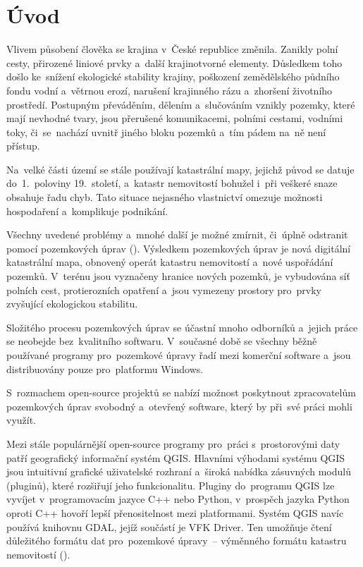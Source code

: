 \chapter{Úvod}
\label{1-uvod}

Vlivem působení člověka se krajina v~České republice změnila. Zanikly polní cesty, přirozené liniové prvky a~další krajinotvorné elementy. Důsledkem toho došlo ke~sní\-žení ekologické stability krajiny, poškození zemědělského půdního fondu vodní a~vě\-trnou erozí, narušení krajinného rázu a~zhoršení životního prostředí. Postupným převáděním, dělením a~slučováním vznikly pozemky, které mají nevhodné tvary, jsou přerušené komunikacemi, polními cestami, vodními toky, či~se~nachází uvnitř jiného bloku pozemků a~tím pádem na~ně není přístup.

Na~velké části území se stále používají katastrální mapy, jejichž původ se datuje do~1.~poloviny 19.~století, a~katastr nemovitostí bohužel i~při veškeré snaze obsahuje řadu chyb. Tato situace nejasného vlastnictví omezuje možnosti hospodaření a~komplikuje podnikání.

Všechny uvedené problémy a~mnohé další je možné zmírnit, či~úplně odstranit pomocí pozemkových úprav (). Výsledkem pozemkových úprav je nová digi\-tální katastrální mapa, obnovený operát katastru nemovitostí a~nové uspořádání pozemků. V~terénu jsou vyznačeny hranice nových pozemků, je vybudována síť polních cest, protierozních opatření a~jsou vymezeny prostory pro~prvky zvyšující ekologickou stabilitu.

Složitého procesu pozemkových úprav se účastní mnoho odborníků a~jejich práce se neobejde bez~kvalitního softwaru. V~současné době se všechny běžně používané programy pro~pozemkové úpravy řadí mezi komerční software a~jsou distribuovány pouze pro~platformu Windows.

S~rozmachem open-source projektů se nabízí možnost poskytnout zpracovatelům pozemkových úprav svobodný a~otevřený software, který by při~své práci mohli využít.

Mezi stále populárnější open-source programy pro~práci s~prostorovými daty patří geografický informační systém QGIS. Hlavními výhodami systému QGIS jsou intuitivní grafické uživatelské rozhraní a~široká nabídka zásuvných modulů (pluginů), které rozšiřují jeho funkcionalitu. Pluginy do~programu QGIS lze vyvíjet v~programovacím jazyce C++ nebo Python, v~prospěch jazyka Python oproti C++ ho\-voří lepší přenositelnost mezi platformami. Systém QGIS navíc používá knihovnu GDAL, jejíž součástí je VFK Driver. Ten umožňuje čtení důležitého formátu dat pro~pozemkové úpravy~– výměnného formátu katastru nemovitostí ().

